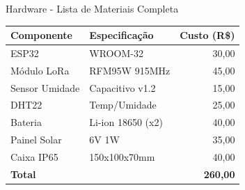 \documentclass[aspectratio=169]{beamer}
\begin{document}
\begin{frame}{Hardware - Lista de Materiais Completa}
  \begin{table}
    \tiny
    \centering
    \begin{tabular}{llr}
      \toprule
      \textbf{Componente} & \textbf{Especificação} & \textbf{Custo (R\$)} \\
      \midrule
      ESP32 & WROOM-32 & 30,00 \\
      Módulo LoRa & RFM95W 915MHz & 45,00 \\
      Sensor Umidade & Capacitivo v1.2 & 15,00 \\
      DHT22 & Temp/Umidade & 25,00 \\
      Bateria & Li-ion 18650 (x2) & 40,00 \\
      Painel Solar & 6V 1W & 35,00 \\
      Caixa IP65 & 150x100x70mm & 40,00 \\
      \midrule
      \textbf{Total} & & \textbf{~260,00} \\
      \bottomrule
    \end{tabular}
  \end{table}
\end{frame}
\end{document}
